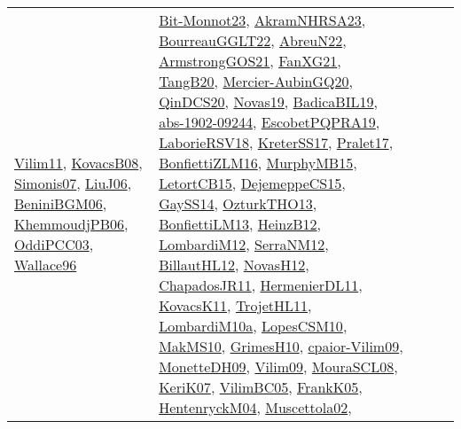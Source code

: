 {\begin{longtable}{lp{3cm}>{\raggedright}p{6cm}>{\raggedright}p{6cm}p{8cm}}
\href{papers/Vilim11.pdf}{Vilim11}\cite{Vilim11}, \href{articles/KovacsB08.pdf}{KovacsB08}\cite{KovacsB08}, \href{articles/Simonis07.pdf}{Simonis07}\cite{Simonis07}, \href{papers/LiuJ06.pdf}{LiuJ06}\cite{LiuJ06}, \href{papers/BeniniBGM06.pdf}{BeniniBGM06}\cite{BeniniBGM06}, \href{papers/KhemmoudjPB06.pdf}{KhemmoudjPB06}\cite{KhemmoudjPB06}, \href{papers/OddiPCC03.pdf}{OddiPCC03}\cite{OddiPCC03}, \href{articles/Wallace96.pdf}{Wallace96}\cite{Wallace96} & \href{papers/Bit-Monnot23.pdf}{Bit-Monnot23}\cite{Bit-Monnot23}, \href{articles/AkramNHRSA23.pdf}{AkramNHRSA23}\cite{AkramNHRSA23}, \href{articles/BourreauGGLT22.pdf}{BourreauGGLT22}\cite{BourreauGGLT22}, \href{articles/AbreuN22.pdf}{AbreuN22}\cite{AbreuN22}, \href{papers/ArmstrongGOS21.pdf}{ArmstrongGOS21}\cite{ArmstrongGOS21}, \href{articles/FanXG21.pdf}{FanXG21}\cite{FanXG21}, \href{papers/TangB20.pdf}{TangB20}\cite{TangB20}, \href{papers/Mercier-AubinGQ20.pdf}{Mercier-AubinGQ20}\cite{Mercier-AubinGQ20}, \href{articles/QinDCS20.pdf}{QinDCS20}\cite{QinDCS20}, \href{articles/Novas19.pdf}{Novas19}\cite{Novas19}, \href{papers/BadicaBIL19.pdf}{BadicaBIL19}\cite{BadicaBIL19}, \href{articles/abs-1902-09244.pdf}{abs-1902-09244}\cite{abs-1902-09244}, \href{articles/EscobetPQPRA19.pdf}{EscobetPQPRA19}\cite{EscobetPQPRA19}, \href{articles/LaborieRSV18.pdf}{LaborieRSV18}\cite{LaborieRSV18}, \href{articles/KreterSS17.pdf}{KreterSS17}\cite{KreterSS17}, \href{papers/Pralet17.pdf}{Pralet17}\cite{Pralet17}, \href{papers/BonfiettiZLM16.pdf}{BonfiettiZLM16}\cite{BonfiettiZLM16}, \href{papers/MurphyMB15.pdf}{MurphyMB15}\cite{MurphyMB15}, \href{articles/LetortCB15.pdf}{LetortCB15}\cite{LetortCB15}, \href{papers/DejemeppeCS15.pdf}{DejemeppeCS15}\cite{DejemeppeCS15}, \href{papers/GaySS14.pdf}{GaySS14}\cite{GaySS14}, \href{articles/OzturkTHO13.pdf}{OzturkTHO13}\cite{OzturkTHO13}, \href{papers/BonfiettiLM13.pdf}{BonfiettiLM13}\cite{BonfiettiLM13}, \href{papers/HeinzB12.pdf}{HeinzB12}\cite{HeinzB12}, \href{articles/LombardiM12.pdf}{LombardiM12}\cite{LombardiM12}, \href{papers/SerraNM12.pdf}{SerraNM12}\cite{SerraNM12}, \href{papers/BillautHL12.pdf}{BillautHL12}\cite{BillautHL12}, \href{articles/NovasH12.pdf}{NovasH12}\cite{NovasH12}, \href{papers/ChapadosJR11.pdf}{ChapadosJR11}\cite{ChapadosJR11}, \href{papers/HermenierDL11.pdf}{HermenierDL11}\cite{HermenierDL11}, \href{articles/KovacsK11.pdf}{KovacsK11}\cite{KovacsK11}, \href{articles/TrojetHL11.pdf}{TrojetHL11}\cite{TrojetHL11}, \href{articles/LombardiM10a.pdf}{LombardiM10a}\cite{LombardiM10a}, \href{articles/LopesCSM10.pdf}{LopesCSM10}\cite{LopesCSM10}, \href{papers/MakMS10.pdf}{MakMS10}\cite{MakMS10}, \href{papers/GrimesH10.pdf}{GrimesH10}\cite{GrimesH10}, \href{papers/cpaior-Vilim09.pdf}{cpaior-Vilim09}\cite{cpaior-Vilim09}, \href{papers/MonetteDH09.pdf}{MonetteDH09}\cite{MonetteDH09}, \href{papers/Vilim09.pdf}{Vilim09}\cite{Vilim09}, \href{papers/MouraSCL08.pdf}{MouraSCL08}\cite{MouraSCL08}, \href{papers/KeriK07.pdf}{KeriK07}\cite{KeriK07}, \href{articles/VilimBC05.pdf}{VilimBC05}\cite{VilimBC05}, \href{papers/FrankK05.pdf}{FrankK05}\cite{FrankK05}, \href{papers/HentenryckM04.pdf}{HentenryckM04}\cite{HentenryckM04}, \href{papers/Muscettola02.pdf}{Muscettola02}\cite{Muscettola02}, 
\end{longtable}}
